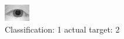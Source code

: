 \begin{figure}[h!]
\begin{center}
\includegraphics[width=0.60\columnwidth]{figures/ID1020_class_1_target_2.png}
\end{center}
\caption{ Classification: 1 actual target: 2}
\label{fig:ID1020_class_1_target_2}
\end{figure}
